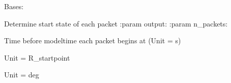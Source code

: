 \documentclass[letterpaper,10pt,english]{sphinxmanual}
\begin{document}
\begin{fulllineitems}
\label{\detokenize{nexoclom2/nexoclom2.particle_tracking.starting_point:nexoclom2.particle_tracking.starting_point.StartingPoint}}
\pysigstartsignatures
\pysiglinewithargsret
{}
{\sphinxparamcomma {}}
{}
\pysigstopsignatures
\sphinxAtStartPar
Bases: 

\sphinxAtStartPar
Determine start state of each packet
:param output:
:param n\_packets:

\begin{fulllineitems}
\label{\detokenize{nexoclom2/nexoclom2.particle_tracking.starting_point:nexoclom2.particle_tracking.starting_point.StartingPoint.time}}
\pysigstartsignatures
\pysigline
{}
\pysigstopsignatures
\sphinxAtStartPar
Time before modeltime each packet begins at (Unit = s)

\end{fulllineitems}



\begin{fulllineitems}

\pysigstartsignatures
\pysigline
{}
\pysigstopsignatures
\sphinxAtStartPar
Unit = R\_startpoint

\end{fulllineitems}



\begin{fulllineitems}

\pysigstartsignatures
\pysigline
{}
\pysigstopsignatures
\end{fulllineitems}



\begin{fulllineitems}

\pysigstartsignatures
\pysigline
{}
\pysigstopsignatures
\sphinxAtStartPar
Unit = deg

\end{fulllineitems}


\end{fulllineitems}
\end{document}
